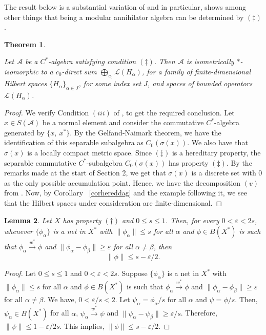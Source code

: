 \documentclass[11pt]{amsart}
\newcommand{\e}{\varepsilon}
\newtheorem{thm}{Theorem}
\newtheorem{lem}[thm]{Lemma}
\begin{document}
The result below is a substantial variation of \cite[Theorem 2]{CPW} and in particular, shows among other things that being a modular annihilator algebra can be determined by $(\ddag)$.
\begin{thm} \label{thmdagsubdif}
	
	 Let ${\mathcal A}$ be a $C^\ast$-algebra satisfying condition $(\ddag)$. Then ${\mathcal A}$ is isometrically $*$-isomorphic to  a $c_0$-direct sum $\bigoplus_{c_0} {\mathcal L}(H_{\alpha})$, for a family of finite-dimensional Hilbert spaces $\{H_{\alpha}\}_{\alpha \in J}$, for some index set $J$, and spaces of bounded operators ${\mathcal L}(H_{\alpha})$.
\end{thm}

\begin{proof}
	 We verify Condition $(iii)$ of \cite[Theorem 2]{CPW}, to get the required conclusion. Let $x \in S({\mathcal A})$  be a normal element and consider the commutative $C^*$-algebra generated by $\{x,~x^*\}$. By the Gelfand-Naimark theorem, we have the identification of this separable subalgebra as $C_0(\sigma(x))$. We also have that $\sigma(x)$ is a locally compact metric space. Since $(\ddag)$ is a hereditary property, the separable commutative $C^*$-subalgebra $C_0(\sigma(x))$ has property $(\ddag)$. By the remarks made at the start of Section 2, we get that $\sigma(x)$ is a discrete set with $0$ as the only possible accumulation point. Hence, we have the decomposition $(v)$ from \cite[Theorem 2]{CPW}. Now, by Corollary ~\ref{corhereddag} and the example following it, we see that the Hilbert spaces under consideration are finite-dimensional.
	
\end{proof}

\begin{lem} \label{lnormal}
	Let $X$ has property $(\dagger)$ and $0 \leq s \leq 1$. Then, for every $0 <\e <2s$, whenever $\{\phi_{\alpha}\}$ is a net in $X^*$ with $\|\phi_{\alpha}\| \leq s$ for all $\alpha$ and $\phi \in B(X^*)$ is such that $\phi_{\alpha} \xrightarrow{w^\ast} \phi$ and $\|\phi_{\alpha}-\phi_{\beta}\| \geq \e$ for all $\alpha \neq \beta$, then
	\[
	\|\phi\| \leq s - \e/2.
	\]
\end{lem}

\begin{proof}
	Let $0 \leq s \leq 1$ and $0 <\e <2s$. Suppose $\{\phi_{\alpha}\}$ is a net in $X^*$ with $\|\phi_{\alpha}\| \leq s$ for all $\alpha$ and $\phi \in B(X^*)$ is such that $\phi_{\alpha} \xrightarrow{w^\ast} \phi$ and $\|\phi_{\alpha}-\phi_{\beta}\| \geq \e$ for all $\alpha \neq \beta$.
	We have, $0 <\e/s <2$. Let $\psi_{\alpha}=\phi_{\alpha}/s$ for all $\alpha$ and $\psi=\phi/s$. Then, $\psi_\alpha \in B(X^*)$ for all $\alpha$, $\psi_{\alpha} \xrightarrow{w^\ast} \psi$ and $\|\psi_{\alpha}-\psi_{\beta}\| \geq \e/s$. Therefore,
	$\|\psi\| \leq 1 - \e/2s$. This implies, $\|\phi\| \leq s - \e/2$.
\end{proof}
\end{document}
